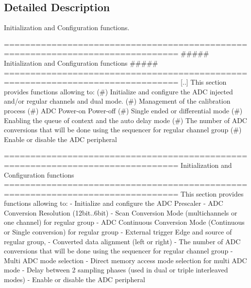 \subsection{Detailed Description}
Initialization and Configuration functions. \begin{DoxyVerb} ===============================================================================
                 ##### Initialization and Configuration functions  #####
 ===============================================================================  
  [..] 
  This section provides functions allowing to:
   (#) Initialize and configure the ADC injected and/or regular channels and dual mode.
   (#) Management of the calibration process
   (#) ADC Power-on Power-off
   (#) Single ended or differential mode 
   (#) Enabling the queue of context and the auto delay mode
   (#) The number of ADC conversions that will be done using the sequencer for regular 
       channel group
   (#) Enable or disable the ADC peripheral\end{DoxyVerb}


\begin{DoxyVerb} ===============================================================================
                      Initialization and Configuration functions
 ===============================================================================  
  This section provides functions allowing to:
   - Initialize and configure the ADC Prescaler
   - ADC Conversion Resolution (12bit..6bit)
   - Scan Conversion Mode (multichannels or one channel) for regular group
   - ADC Continuous Conversion Mode (Continuous or Single conversion) for 
     regular group
   - External trigger Edge and source of regular group, 
   - Converted data alignment (left or right)
   - The number of ADC conversions that will be done using the sequencer for 
     regular channel group
   - Multi ADC mode selection
   - Direct memory access mode selection for multi ADC mode  
   - Delay between 2 sampling phases (used in dual or triple interleaved modes)
   - Enable or disable the ADC peripheral\end{DoxyVerb}
 

